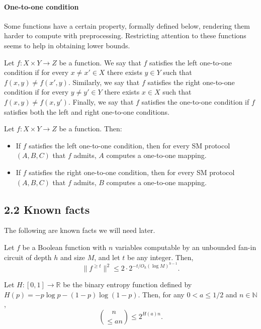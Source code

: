\paragraph{One-to-one condition}
Some functions have a certain property, formally defined below, rendering them harder to compute with preprocessing. Restricting attention to these functions seems to help in obtaining lower bounds.
\begin{ntdefinition}
Let $f:X\times Y\to Z$ be a function. We say that $f$ satisfies the left one-to-one condition if for every $x\ne x'\in X$ there exists $y\in Y$ such that $f(x,y)\ne f(x',y)$. Similarly, we say that $f$ satisfies the right one-to-one condition if for every $y\ne y'\in Y$ there exists $x\in X$ such that $f(x,y)\ne f(x,y')$. Finally, we say that $f$ satisfies the one-to-one condition if $f$ satisfies both the left and right one-to-one conditions.
\end{ntdefinition}
\begin{ntproposition}
Let $f:X\times Y\to Z$ be a function. Then:
\begin{itemize}
\item If $f$ satisfies the left one-to-one condition, then for every SM protocol $(A,B,C)$ that $f$ admits, $A$ computes a one-to-one mapping.
\item If $f$ satisfies the right one-to-one condition, then for every SM protocol $(A,B,C)$ that $f$ admits, $B$ computes a one-to-one mapping.
\end{itemize}
\end{ntproposition}
\subsection*{2.2 Known facts}
The following are known facts we will need later.
\begin{nttheorem}
Let $f$ be a Boolean function with $n$ variables computable by an unbounded fan-in circuit of depth $h$ and size $M$, and let $t$ be any integer. Then,
\[\|f^{\geq t}\|^2\leq2\cdot2^{-t/O_h(\log M)^{h-1}}.\]
\end{nttheorem}
\begin{ntlemma}
Let $H:[0,1]\to\mathbb R$ be the binary entropy function defined by $H(p)=-p\log p-(1-p)\log(1-p)$. Then, for any $0<a\leq1/2$ and $n\in\mathbb N$,
\[\binom n{\leq an}\leq2^{H(a)n}.\]
\end{ntlemma}
